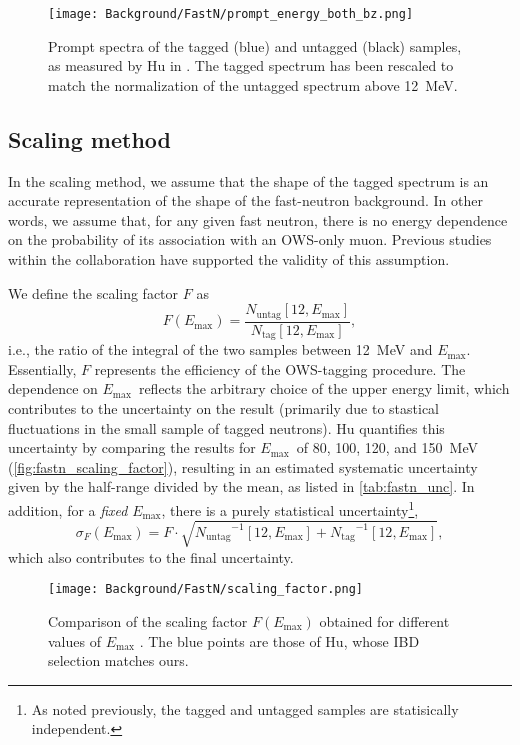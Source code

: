 \documentclass[../thesis.tex]{subfiles}
\begin{document}
\begin{figure}[h]
  \texttt{[image: Background/FastN/prompt\_energy\_both\_bz.png]}
  \caption{Prompt spectra of the tagged (blue) and untagged (black) samples, as measured by Hu in \cite{fastn}. The tagged spectrum has been rescaled to match the normalization of the untagged spectrum above 12~MeV.}
  \label{fig:fastn_prompt_energy_both_bz}
\end{figure}

\subsection{Scaling method}
\label{sec:fastn_scaling}

In the scaling method, we assume that the shape of the tagged spectrum is an accurate representation of the shape of the fast-neutron background. In other words, we assume that, for any given fast neutron, there is no energy dependence on the probability of its association with an OWS-only muon. Previous studies within the collaboration have supported the validity of this assumption.

\def\emax{\ensuremath{E_\mathrm{max}}} \def\ntag{\ensuremath{N_\mathrm{tag}}}
\def\nuntag{\ensuremath{N_\mathrm{untag}}}

We define the scaling factor $F$ as \[ F(\emax) = \frac{\nuntag[12, \emax]}{\ntag[12, \emax]}, \] i.e., the ratio of the integral of the two samples between 12~MeV and \emax. Essentially, $F$ represents the efficiency of the OWS-tagging procedure. The dependence on \emax\ reflects the arbitrary choice of the upper energy limit, which contributes to the uncertainty on the result (primarily due to stastical fluctuations in the small sample of tagged neutrons). Hu quantifies this uncertainty by comparing the results for \emax\ of 80, 100, 120, and 150~MeV (\autoref{fig:fastn_scaling_factor}), resulting in an estimated systematic uncertainty given by the half-range divided by the mean, as listed in \autoref{tab:fastn_unc}. In addition, for a \emph{fixed} \emax, there is a purely statistical uncertainty\footnote{As noted previously, the tagged and untagged samples are statisically independent.},
\[ \sigma_F(\emax) = F \cdot \sqrt{\nuntag^{-1}[12, \emax] + \ntag^{-1}[12,
    \emax]},
\]
which also contributes to the final uncertainty.

\begin{figure}[h]
  \texttt{[image: Background/FastN/scaling\_factor.png]}
  \caption{Comparison of the scaling factor $F(E_{\mathrm{max}})$ obtained for different values of $E_{\mathrm{max}}$ \cite{fastn}. The blue points are those of Hu, whose IBD selection matches ours.}
  \label{fig:fastn_scaling_factor}
\end{figure}
\end{document}
